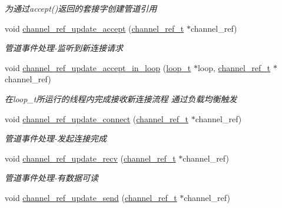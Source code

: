 \begin{DoxyCompactItemize}
\begin{DoxyCompactList}\small\item\em 为通过accept()返回的套接字创建管道引用 \end{DoxyCompactList}\item 
void \hyperlink{a00047_a31545bffe4e0837eaf754465732642c4_a31545bffe4e0837eaf754465732642c4}{channel\+\_\+ref\+\_\+update\+\_\+accept} (\hyperlink{a00050_a151271c9d188ef28d4d24bb81dcc1263_a151271c9d188ef28d4d24bb81dcc1263}{channel\+\_\+ref\+\_\+t} $\ast$channel\+\_\+ref)
\begin{DoxyCompactList}\small\item\em 管道事件处理-\/监听到新连接请求 \end{DoxyCompactList}\item 
void \hyperlink{a00047_af2b04a39619b524c176a1b921a2a662d_af2b04a39619b524c176a1b921a2a662d}{channel\+\_\+ref\+\_\+update\+\_\+accept\+\_\+in\+\_\+loop} (\hyperlink{a00050_a9c3ad1cd2de83e09f3a7b59fa82c94ee_a9c3ad1cd2de83e09f3a7b59fa82c94ee}{loop\+\_\+t} $\ast$loop, \hyperlink{a00050_a151271c9d188ef28d4d24bb81dcc1263_a151271c9d188ef28d4d24bb81dcc1263}{channel\+\_\+ref\+\_\+t} $\ast$channel\+\_\+ref)
\begin{DoxyCompactList}\small\item\em 在loop\+\_\+t所运行的线程内完成接收新连接流程 通过负载均衡触发 \end{DoxyCompactList}\item 
void \hyperlink{a00047_ac3dee255a82a9d1fb1fc3c63a2905a5a_ac3dee255a82a9d1fb1fc3c63a2905a5a}{channel\+\_\+ref\+\_\+update\+\_\+connect} (\hyperlink{a00050_a151271c9d188ef28d4d24bb81dcc1263_a151271c9d188ef28d4d24bb81dcc1263}{channel\+\_\+ref\+\_\+t} $\ast$channel\+\_\+ref)
\begin{DoxyCompactList}\small\item\em 管道事件处理-\/发起连接完成 \end{DoxyCompactList}\item 
void \hyperlink{a00047_a1c47df1906826a2a5b6d99fbc51918d1_a1c47df1906826a2a5b6d99fbc51918d1}{channel\+\_\+ref\+\_\+update\+\_\+recv} (\hyperlink{a00050_a151271c9d188ef28d4d24bb81dcc1263_a151271c9d188ef28d4d24bb81dcc1263}{channel\+\_\+ref\+\_\+t} $\ast$channel\+\_\+ref)
\begin{DoxyCompactList}\small\item\em 管道事件处理-\/有数据可读 \end{DoxyCompactList}\item 
void \hyperlink{a00047_ae7b781b5faec09b7bd383e4e59dfb40f_ae7b781b5faec09b7bd383e4e59dfb40f}{channel\+\_\+ref\+\_\+update\+\_\+send} (\hyperlink{a00050_a151271c9d188ef28d4d24bb81dcc1263_a151271c9d188ef28d4d24bb81dcc1263}{channel\+\_\+ref\+\_\+t} $\ast$channel\+\_\+ref)

\end{DoxyCompactItemize}
